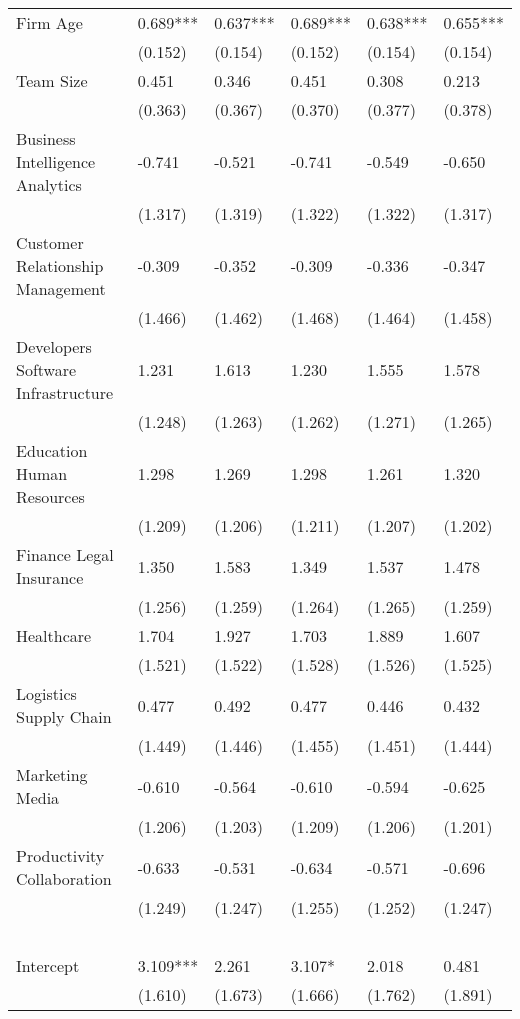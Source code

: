\documentclass[12pt]{article}
\begin{document}
\begin{table}[!ht]
\begin{tabular}{llllll}
        Firm Age & 0.689*** & 0.637*** & 0.689*** & 0.638*** & 0.655*** \\
        ~ & (0.152) & (0.154) & (0.152) & (0.154) & (0.154) \\
        Team Size & 0.451 & 0.346 & 0.451 & 0.308 & 0.213 \\
        ~ & (0.363) & (0.367) & (0.370) & (0.377) & (0.378) \\
        Business Intelligence Analytics & -0.741 & -0.521 & -0.741 & -0.549 & -0.650 \\
        ~ & (1.317) & (1.319) & (1.322) & (1.322) & (1.317) \\
        Customer Relationship Management & -0.309 & -0.352 & -0.309 & -0.336 & -0.347 \\
        ~ & (1.466) & (1.462) & (1.468) & (1.464) & (1.458) \\
        Developers Software Infrastructure & 1.231 & 1.613 & 1.230 & 1.555 & 1.578 \\
        ~ & (1.248) & (1.263) & (1.262) & (1.271) & (1.265) \\
        Education Human Resources & 1.298 & 1.269 & 1.298 & 1.261 & 1.320 \\
        ~ & (1.209) & (1.206) & (1.211) & (1.207) & (1.202) \\
        Finance Legal Insurance & 1.350 & 1.583 & 1.349 & 1.537 & 1.478 \\
        ~ & (1.256) & (1.259) & (1.264) & (1.265) & (1.259) \\
        Healthcare & 1.704 & 1.927 & 1.703 & 1.889 & 1.607 \\
        ~ & (1.521) & (1.522) & (1.528) & (1.526) & (1.525) \\
        Logistics Supply Chain & 0.477 & 0.492 & 0.477 & 0.446 & 0.432 \\
        ~ & (1.449) & (1.446) & (1.455) & (1.451) & (1.444) \\
        Marketing Media & -0.610 & -0.564 & -0.610 & -0.594 & -0.625 \\
        ~ & (1.206) & (1.203) & (1.209) & (1.206) & (1.201) \\
        Productivity Collaboration & -0.633 & -0.531 & -0.634 & -0.571 & -0.696 \\
        ~ & (1.249) & (1.247) & (1.255) & (1.252) & (1.247) \\
        & ~ & ~ & ~ & ~ & ~ \\
        Intercept & 3.109*** & 2.261 & 3.107* & 2.018 & 0.481  \\
        ~ & (1.610) & (1.673) & (1.666) & (1.762) & (1.891) \\

\end{tabular}
\end{table}
\end{document}
